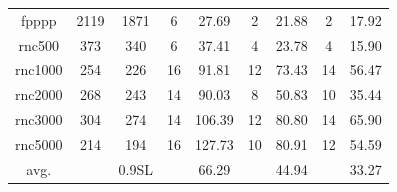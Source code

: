 \documentclass[10pt,journal]{IEEEtran}
\begin{document}
\begin{table}[!t]
\begin{tabular}{c|c|c|c|c|c|c|c|c}
fpppp           &\hspace*{-0.5em}2119\hspace*{-0.5em}  &\hspace*{-0.5em}1871\hspace*{-0.5em}  &6 &27.69  &2   &21.88  &2   &17.92  \\


\hspace*{-0.5em}rnc500\hspace*{-0.5em}          &373    &340   &6  &37.41  &4  &23.78   &4  &15.90  \\


\hspace*{-0.5em}rnc1000\hspace*{-0.5em}              &254   &226    &16 &91.81  &12   &73.43  &14  &56.47   \\


\hspace*{-0.5em}rnc2000\hspace*{-0.5em}            &268    &243    &14  &90.03  &8      &50.83  &10 &35.44   \\



\hspace*{-0.5em}rnc3000\hspace*{-0.5em}           &304  &274  &14  &\hspace*{-0.5em}106.39\hspace*{-0.5em}  &12   &80.80   &14   &65.90  \\



\hspace*{-0.5em}rnc5000\hspace*{-0.5em}           &214    &194  &16  &\hspace*{-0.5em}127.73\hspace*{-0.5em}  &10  &80.91   &12  &54.59    \\
\hline

avg.           &    &\hspace*{-1em}0.9SL\hspace*{-1em}  &   &66.29   &  &44.94   &   &33.27    \\
\hline
\hline
\end{tabular}
\label{table:VPCTC}
\end{table}
\end{document}
